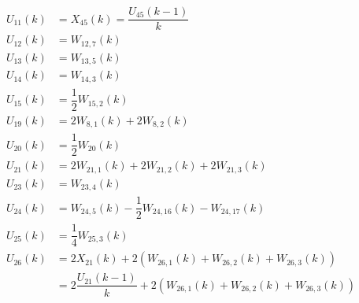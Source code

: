 \begin{align} \label{eq:allRecRel2}
\begin{split}
U_{11} \left(k\right)&= X_{45} \left(k\right)= \dfrac{U_{45} \left(k-1\right)}{k} \\
U_{12} \left(k\right)&= W_{12,7}\left(k\right)\\
U_{13} \left(k\right)&= W_{13,5}\left(k\right)\\
U_{14} \left(k\right)&= W_{14,3}\left(k\right)\\
U_{15} \left(k\right)&= \dfrac{1}{2}W_{15,2}\left(k\right)\\
U_{19} \left(k\right)&= 2W_{8,1}\left(k\right)+2W_{8,2}\left(k\right)\\
U_{20} \left(k\right)&= \dfrac{1}{2}W_{20}\left(k\right)\\
U_{21} \left(k\right)&= 2W_{21,1}\left(k\right)+2W_{21,2}\left(k\right)+2W_{21,3}\left(k\right)\\
U_{23} \left(k\right)&= W_{23,4}\left(k\right)\\
U_{24} \left(k\right)&=  W_{24,5}\left(k\right)-\dfrac{1}{2}W_{24,16}\left(k\right)-W_{24,17}\left(k\right)\\
U_{25} \left(k\right)&=  \dfrac{1}{4}W_{25,3}\left(k\right)\\
U_{26} \left(k\right)&=  2X_{21}\left(k\right)+2\left(W_{26,1}\left(k\right)+W_{26,2}\left(k\right)+W_{26,3}\left(k\right)\right)\\
&=2\dfrac{U_{21}\left(k-1\right)}{k}+2\left(W_{26,1}\left(k\right)+W_{26,2}\left(k\right)+W_{26,3}\left(k\right)\right)\\
\end{split}
\end{align}

